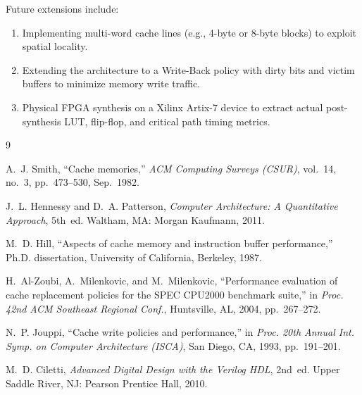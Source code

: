 \documentclass[10pt,twocolumn]{article}
\begin{document}
Future extensions include:
\begin{enumerate}
    \item Implementing multi-word cache lines (e.g., 4-byte or 8-byte blocks) to exploit spatial locality.
    \item Extending the architecture to a Write-Back policy with dirty bits and victim buffers to minimize memory write traffic.
    \item Physical FPGA synthesis on a Xilinx Artix-7 device to extract actual post-synthesis LUT, flip-flop, and critical path timing metrics.
\end{enumerate}

\begin{thebibliography}{9}

A.~J. Smith, ``Cache memories,'' \textit{ACM Computing Surveys (CSUR)}, vol.~14, no.~3, pp.~473--530, Sep.~1982.

J.~L. Hennessy and D.~A. Patterson, \textit{Computer Architecture: A Quantitative Approach}, 5th~ed. Waltham, MA: Morgan Kaufmann, 2011.

M.~D. Hill, ``Aspects of cache memory and instruction buffer performance,'' Ph.D. dissertation, University of California, Berkeley, 1987.

H.~Al-Zoubi, A.~Milenkovic, and M.~Milenkovic, ``Performance evaluation of cache replacement policies for the SPEC CPU2000 benchmark suite,'' in \textit{Proc. 42nd ACM Southeast Regional Conf.}, Huntsville, AL, 2004, pp.~267--272.

N.~P. Jouppi, ``Cache write policies and performance,'' in \textit{Proc. 20th Annual Int. Symp. on Computer Architecture (ISCA)}, San Diego, CA, 1993, pp.~191--201.

M.~D. Ciletti, \textit{Advanced Digital Design with the Verilog HDL}, 2nd~ed. Upper Saddle River, NJ: Pearson Prentice Hall, 2010.

\end{thebibliography}
\end{document}
